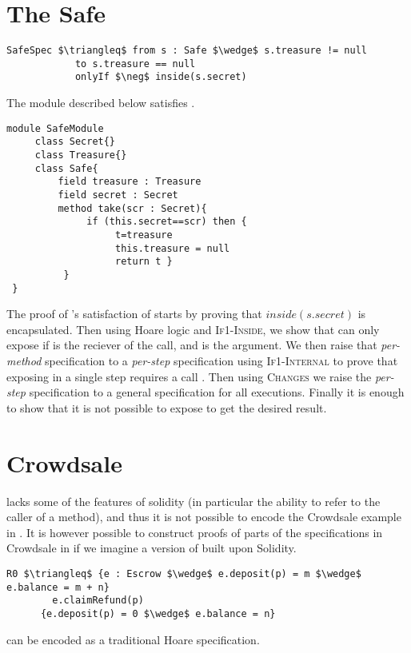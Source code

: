 \documentclass[acmsmall,review,anonymous]{acmart}\settopmatter{printfolios=true,printccs=false,printacmref=false}
\begin{document}
\section{The Safe}

\begin{lstlisting}[language = Chainmail, mathescape=true, frame=lines]
SafeSpec $\triangleq$ from s : Safe $\wedge$ s.treasure != null
            to s.treasure == null
            onlyIf $\neg$ inside(s.secret)
\end{lstlisting}

The module   described  below satisfies  .

\begin{lstlisting}[frame=lines]
module SafeModule
     class Secret{}
     class Treasure{}
     class Safe{
         field treasure : Treasure
         field secret : Secret
         method take(scr : Secret){
              if (this.secret==scr) then {
                   t=treasure
                   this.treasure = null
                   return t } 
          }
 }
\end{lstlisting}
The proof of 's satisfaction of  
starts by proving that $inside (s.secret)$ is encapsulated. Then
using Hoare logic and \textsc{If1-Inside}, we show that  can only expose 
 if  is the reciever of the call, and 
is the argument. We then raise that \emph{per-method} \Nec specification
to a \emph{per-step} \Nec specification using \textsc{If1-Internal} to prove 
that exposing  in a single step requires a call .
Then using \textsc{Changes} we raise the \emph{per-step} \Nec specification to
a general \Nec specification for all executions. Finally it is enough to show 
that it is not possible to expose  to get the desired result.

\section{Crowdsale}

\Loo lacks some of the features of solidity (in particular the ability to refer to the caller of a method), 
and thus it is not possible to encode the Crowdsale example in \Loo. It is however
possible to construct proofs of parts of the specifications in Crowdsale in \Nec if we imagine 
a version of \Nec built upon Solidity.

\begin{lstlisting}[language = Chainmail, mathescape=true, frame=lines]
R0 $\triangleq$ {e : Escrow $\wedge$ e.deposit(p) = m $\wedge$ e.balance = m + n}
        e.claimRefund(p)
      {e.deposit(p) = 0 $\wedge$ e.balance = n}
\end{lstlisting}
 can be encoded as a traditional Hoare specification.
\end{document}
